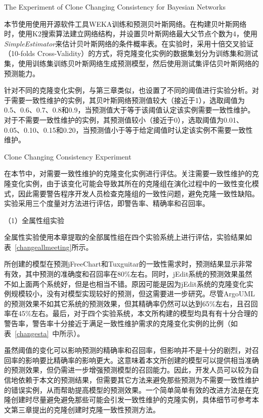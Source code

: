 {The Experiment of Clone Changing Consistency for Bayesian Networks}

本节使用使用开源软件工具WEKA训练和预测贝叶斯网络。在构建贝叶斯网络时，使用K2搜索算法建立网络结构，并设置贝叶斯网络最大父节点个数为4，使用{\em  SimpleEstimator}来估计贝叶斯网络的条件概率表。在实验时，采用十倍交叉验证（10-folds Cross-Validity）的方式，将克隆变化实例的数据集划分为训练集和测试集，使用训练集训练贝叶斯网络生成预测模型，然后使用测试集评估贝叶斯网络的预测能力。

针对不同的克隆变化实例，与第三章类似，也设置了不同的阈值进行实验分析。对于需要一致性维护的实例，其贝叶斯网络预测值较大（接近于1），选取阈值为0.5、0.6、0.7、0.8和0.9，当预测值大于等于该阈值认定该实例需要一致性维护。对于不需要一致性维护的实例，其预测值较小（接近于0），选取阈值为0.01、0.05、0.10、0.15和0.20，当预测值小于等于给定阈值时认定该实例不需要一致性维护。

{Clone Changing Consistency Experiment}

在本节中，对需要一致性维护的克隆变化实例进行评估。关注需要一致性维护的克隆变化实例，由于该变化可能会导致其所在的克隆组在演化过程中的一致性变化模式，因此需要警告程序开发人员检查克隆组的一致性问题，避免克隆一致性缺陷。实验采用三个度量对方法进行评估，即警告率、精确率和召回率。

（1）全属性组实验

全属性实验使用本章提取的全部属性组在四个实验系统上进行评估，实验结果如表~\ref{changeallmeeting}所示。

所创建的模型在预测jFreeChart和Tuxguitar的一致性需求时，预测结果显示非常有效，其中预测的准确度和召回率在80\%左右。同时，jEdit系统的预测效果虽然不如上面两个系统好，但是也相当不错。原因可能是因为jEdit系统的克隆变化实例规模较小，没有对模型实现较好的预测，但这需要进一步研究。尽管ArgoUML的预测效果不如其它系统的预测效果，但其精确率仍然可以达到65\%左右，且召回率在45\%左右。最后，对于四个实验系统，本文所构建的模型均具有有十分合理的警告率，警告率十分接近于满足一致性维护需求的克隆变化实例的比例（如表~\ref {changesta}~中所示）。

虽然阈值的变化可以影响预测的精确率和召回率，但影响并不是十分的剧烈，对召回率的影响要比精确率的影响更大。这意味着本文所创建的模型可以提供相当准确的预测效果，但仍需进一步增强预测模型的召回能力。因此，开发人员可以较为自信地依赖于本文的预测结果，但需要其它方法来避免那些预测为不需要一致性维护的错误实例，从而帮助提高模型的预测效果。一个简单简单有效的改进方法是在克隆创建时尽量避免避免那些可能会引发一致性维护的克隆实例，具体细节可参考本文第三章提出的克隆创建时克隆一致性预测方法。

